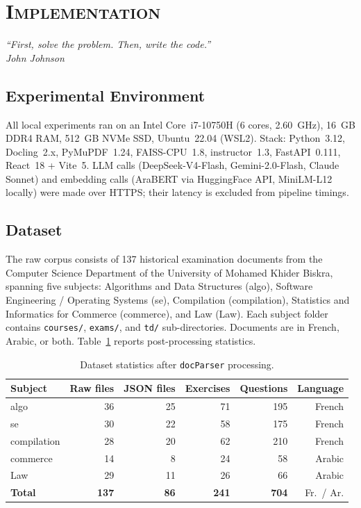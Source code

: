 \newpage
\section{\textsc{Implementation}}
\label{chap:impl}
\lhead{}
\cfoot{\thepage}
\pagestyle{fancy}
\renewcommand{\headrulewidth}{0.4pt}

\begin{flushright}
\textit{``First, solve the problem. Then, write the code.''\\
John Johnson}
\end{flushright}

\subsection{Experimental Environment}
\label{subsec:hardware}

All local experiments ran on an Intel Core~i7-10750H (6 cores, 2.60~GHz),
16~GB DDR4 RAM, 512~GB NVMe SSD, Ubuntu~22.04 (WSL2).
Stack: Python~3.12, Docling~2.x, PyMuPDF~1.24, FAISS-CPU~1.8, instructor~1.3,
FastAPI~0.111, React~18 + Vite~5.
LLM calls (DeepSeek-V4-Flash, Gemini-2.0-Flash, Claude Sonnet) and embedding
calls (AraBERT via HuggingFace API, MiniLM-L12 locally) were made over HTTPS;
their latency is excluded from pipeline timings.

\subsection{Dataset}
\label{subsec:dataset}

The raw corpus consists of 137 historical examination documents from the Computer
Science Department of the University of Mohamed Khider Biskra, spanning five subjects:
Algorithms and Data Structures (algo), Software Engineering / Operating Systems (se),
Compilation (compilation), Statistics and Informatics for Commerce (commerce), and
Law (Law). Each subject folder contains \texttt{courses/}, \texttt{exams/}, and
\texttt{td/} sub-directories. Documents are in French, Arabic, or both.
Table~\ref{tab:dataset} reports post-processing statistics.

\begin{table}[H]
\centering
\caption{Dataset statistics after \texttt{docParser} processing.}
\label{tab:dataset}
\begin{tabular}{lrrrrr}
\toprule
\textbf{Subject} & \textbf{Raw files} & \textbf{JSON files} & \textbf{Exercises}
  & \textbf{Questions} & \textbf{Language} \\
\midrule
algo        & 36  & 25  & 71  & 195 & French \\
se          & 30  & 22  & 58  & 175 & French \\
compilation & 28  & 20  & 62  & 210 & French \\
commerce    & 14  &  8  & 24  &  58 & Arabic \\
Law         & 29  & 11  & 26  &  66 & Arabic \\
\midrule
\textbf{Total} & \textbf{137} & \textbf{86} & \textbf{241} & \textbf{704}
  & Fr.~/ Ar. \\
\bottomrule
\end{tabular}
\end{table}


